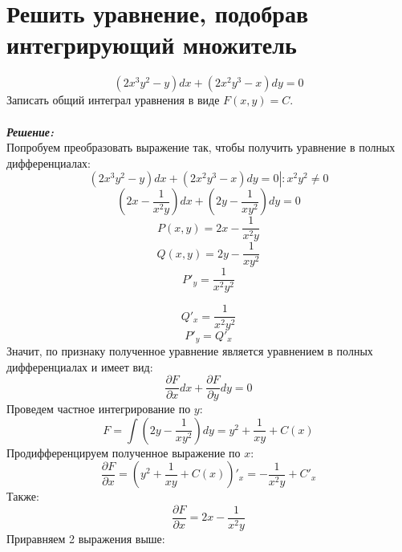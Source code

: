 \documentclass[a5paper, 10pt]{article}
\theoremstyle{definition}
\theoremstyle{plain}
\theoremstyle{remark}
\begin{document}
\section{Решить уравнение, подобрав интегрирующий множитель}
\begin{equation*}
\left(2x^3y^2 - y \right)dx + \left(2x^2y^3-x \right)dy = 0
\end{equation*}
Записать общий интеграл уравнения в виде $F(x, y) = C$.\\\\
\textit{\textbf{Решение:}}\\
Попробуем преобразовать выражение так, чтобы получить уравнение в полных дифференциалах:
\begin{equation*}
\left(2x^3y^2 - y \right)dx + \left(2x^2y^3-x \right)dy = 0  \left| \right. : x^2y^2 \neq 0
\end{equation*}
\begin{equation*}
\left(2x - \frac{1}{x^2y} \right)dx + \left(2y-\frac{1}{xy^2} \right)dy = 0 
\end{equation*}
\begin{equation*}
P(x, y) = 2x - \frac{1}{x^2y}
\end{equation*}
\begin{equation*}
Q(x, y) = 2y-\frac{1}{xy^2} 
\end{equation*}
\begin{equation*}
P'_y = \frac{1}{x^2y^2}
\end{equation*}

\begin{equation*}
Q'_x = \frac{1}{x^2y^2} 
\end{equation*}
\begin{equation*}
P'_y= Q'_x 
\end{equation*}
Значит, по признаку полученное уравнение является уравнением в полных дифференциалах и имеет вид:
\begin{equation*}
\frac{\partial F}{\partial x} dx + \frac{\partial F}{\partial y} dy = 0
\end{equation*}
Проведем частное интегрирование по $y$:
\begin{equation*}
F = \int  \left(2y-\frac{1}{xy^2} \right)  dy = y^2 + \frac{1}{xy} + C(x)
\end{equation*}
Продифференцируем полученное выражение по $x$:
\begin{equation*}
\frac{\partial F}{\partial x} = \left(  y^2 + \frac{1}{xy} + C(x)  \right)'_x =  -\frac{1}{x^2y} + C'_x
\end{equation*}
Также:
\begin{equation*}
\frac{\partial F}{\partial x} =  2x - \frac{1}{x^2y}
\end{equation*}
Приравняем 2 выражения выше:
\end{document}
